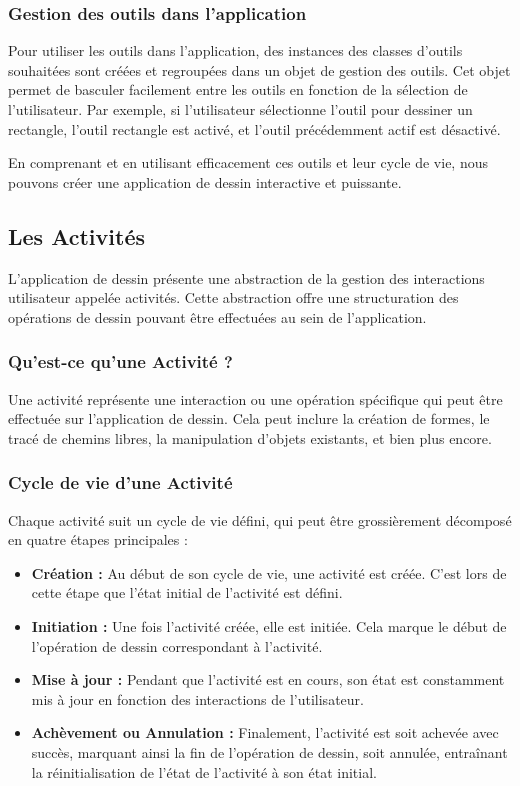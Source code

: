 \subsubsection{Gestion des outils dans l'application}

Pour utiliser les outils dans l'application, des instances des classes d'outils souhaitées sont créées et regroupées dans un objet de gestion des outils. Cet objet permet de basculer facilement entre les outils en fonction de la sélection de l'utilisateur. Par exemple, si l'utilisateur sélectionne l'outil pour dessiner un rectangle, l'outil rectangle est activé, et l'outil précédemment actif est désactivé.

En comprenant et en utilisant efficacement ces outils et leur cycle de vie, nous pouvons créer une application de dessin interactive et puissante.

\subsection{Les Activités}

L'application de dessin présente une abstraction de la gestion des interactions utilisateur appelée \guillemotleft activités\guillemotright. Cette abstraction offre une structuration des opérations de dessin pouvant être effectuées au sein de l'application.

\subsubsection{Qu'est-ce qu'une Activité ?}

Une activité représente une interaction ou une opération spécifique qui peut être effectuée sur l'application de dessin. Cela peut inclure la création de formes, le tracé de chemins libres, la manipulation d'objets existants, et bien plus encore.

\subsubsection{Cycle de vie d'une Activité}

Chaque activité suit un cycle de vie défini, qui peut être grossièrement décomposé en quatre étapes principales :

\begin{itemize}
    \item \textbf{Création :} Au début de son cycle de vie, une activité est créée. C'est lors de cette étape que l'état initial de l'activité est défini.
    \item \textbf{Initiation :} Une fois l'activité créée, elle est initiée. Cela marque le début de l'opération de dessin correspondant à l'activité.
    \item \textbf{Mise à jour :} Pendant que l'activité est en cours, son état est constamment mis à jour en fonction des interactions de l'utilisateur.
    \item \textbf{Achèvement ou Annulation :} Finalement, l'activité est soit achevée avec succès, marquant ainsi la fin de l'opération de dessin, soit annulée, entraînant la réinitialisation de l'état de l'activité à son état initial.
\end{itemize}

